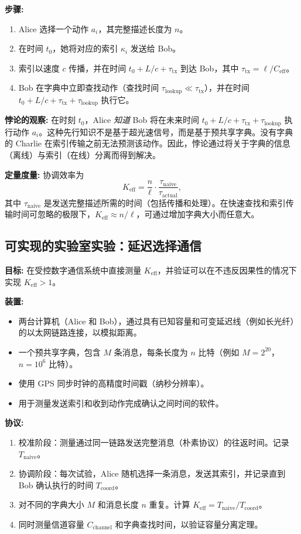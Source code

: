 \documentclass[12pt]{article}
\begin{document}
	\textbf{步骤:}
	\begin{enumerate}
		\item Alice 选择一个动作 \(a_i\)，其完整描述长度为 \(n\)。
		\item 在时间 \(t_0\)，她将对应的索引 \(\kappa_i\) 发送给 Bob。
		\item 索引以速度 \(c\) 传播，并在时间 \(t_0 + L/c + \tau_{\text{tx}}\) 到达 Bob，其中 \(\tau_{\text{tx}} = \ell / C_{\text{eff}}\)。
		\item Bob 在字典中立即查找动作（查找时间 \(\tau_{\text{lookup}} \ll \tau_{\text{tx}}\)），并在时间 \(t_0 + L/c + \tau_{\text{tx}} + \tau_{\text{lookup}}\) 执行它。
	\end{enumerate}
	
	\textbf{悖论的观察:}
	在时刻 \(t_0\)，Alice \emph{知道} Bob 将在未来时间 \(t_0 + L/c + \tau_{\text{tx}} + \tau_{\text{lookup}}\) 执行动作 \(a_i\)。这种先行知识不是基于超光速信号，而是基于预共享字典。没有字典的 Charlie 在索引传输之前无法预测该动作。因此，悖论通过将关于字典的信息（离线）与索引（在线）分离而得到解决。
	
	\textbf{定量度量:}
	协调效率为
	\[
	K_{\mathrm{eff}} = \frac{n}{\ell} \cdot \frac{\tau_{\text{naive}}}{\tau_{\text{actual}}},
	\]
	其中 \(\tau_{\text{naive}}\) 是发送完整描述所需的时间（包括传播和处理）。在快速查找和索引传输时间可忽略的极限下，\(K_{\mathrm{eff}} \approx n/\ell\)，可通过增加字典大小而任意大。
	
	\subsection{可实现的实验室实验：延迟选择通信}
	\label{subsec:lab-delayed-choice}
	
	\textbf{目标:} 在受控数字通信系统中直接测量 \(K_{\mathrm{eff}}\)，并验证可以在不违反因果性的情况下实现 \(K_{\mathrm{eff}} > 1\)。
	
	\textbf{装置:}
	\begin{itemize}
		\item 两台计算机（Alice 和 Bob），通过具有已知容量和可变延迟线（例如长光纤）的以太网链路连接，以模拟距离。
		\item 一个预共享字典，包含 \(M\) 条消息，每条长度为 \(n\) 比特（例如 \(M = 2^{20}\)，\(n = 10^6\) 比特）。
		\item 使用 GPS 同步时钟的高精度时间戳（纳秒分辨率）。
		\item 用于测量发送索引和收到动作完成确认之间时间的软件。
	\end{itemize}
	
	\textbf{协议:}
	\begin{enumerate}
		\item 校准阶段：测量通过同一链路发送完整消息（朴素协议）的往返时间。记录 \(T_{\text{naive}}\)。
		\item 协调阶段：每次试验，Alice 随机选择一条消息，发送其索引，并记录直到 Bob 确认执行的时间 \(T_{\text{coord}}\)。
		\item 对不同的字典大小 \(M\) 和消息长度 \(n\) 重复。计算 \(K_{\mathrm{eff}} = T_{\text{naive}} / T_{\text{coord}}\)。
		\item 同时测量信道容量 \(C_{\text{channel}}\) 和字典查找时间，以验证容量分离定理。
	\end{enumerate}
	
\end{document}
